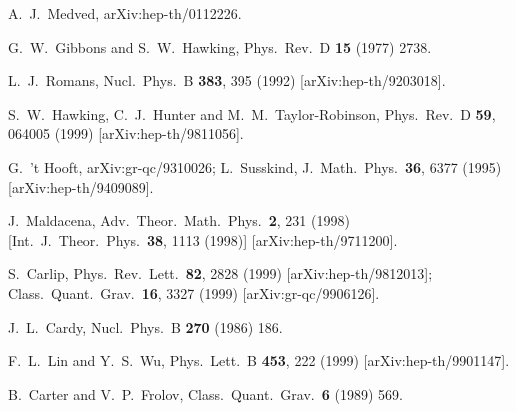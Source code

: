 \documentclass[a4paper,12pt]{article}
\begin{document}
\begin{thebibliography}{99}
A.~J.~Medved,
arXiv:hep-th/0112226.


G.~W.~Gibbons and S.~W.~Hawking,
Phys.\ Rev.\ D {\bf 15} (1977) 2738.

L.~J.~Romans,
Nucl.\ Phys.\ B {\bf 383}, 395 (1992)
[arXiv:hep-th/9203018].

S.~W.~Hawking, C.~J.~Hunter and M.~M.~Taylor-Robinson,
Phys.\ Rev.\ D {\bf 59}, 064005 (1999)
[arXiv:hep-th/9811056].

G.~'t Hooft,
arXiv:gr-qc/9310026; 
L.~Susskind,
J.\ Math.\ Phys.\  {\bf 36}, 6377 (1995)
[arXiv:hep-th/9409089].

J.~Maldacena,
Adv.\ Theor.\ Math.\ Phys.\  {\bf 2}, 231 (1998)
[Int.\ J.\ Theor.\ Phys.\  {\bf 38}, 1113 (1998)]
[arXiv:hep-th/9711200].

S.~Carlip,
Phys.\ Rev.\ Lett.\  {\bf 82}, 2828 (1999)
[arXiv:hep-th/9812013]; 
Class.\ Quant.\ Grav.\  {\bf 16}, 3327 (1999)
[arXiv:gr-qc/9906126].

J.~L.~Cardy,
Nucl.\ Phys.\ B {\bf 270} (1986) 186.


F.~L.~Lin and Y.~S.~Wu,
Phys.\ Lett.\ B {\bf 453}, 222 (1999)
[arXiv:hep-th/9901147].

B.~Carter and V.~P.~Frolov,
Class.\ Quant.\ Grav.\  {\bf 6} (1989) 569.


\end{thebibliography}
\end{document}
